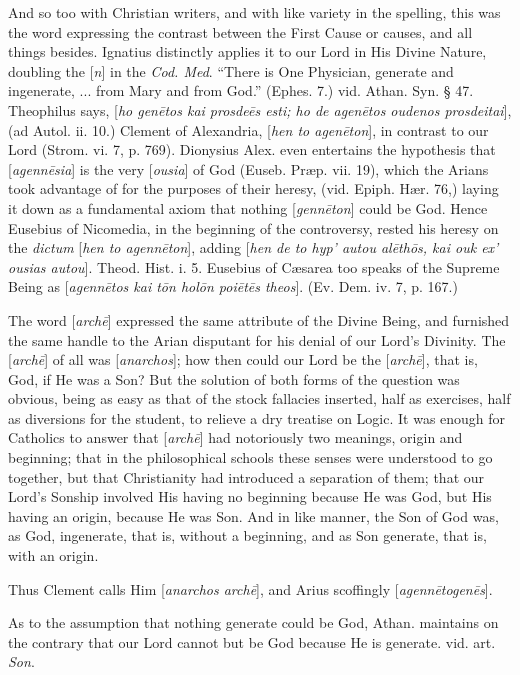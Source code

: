 And so too with Christian writers, and with like
variety in the spelling, this was the word expressing the contrast
between the First Cause or causes, and all things besides. Ignatius
distinctly applies it to our Lord in His Divine Nature, doubling the [\emph{n}]
in the \emph{Cod. Med}. ``There is One Physician, generate and
ingenerate, ... from Mary and from God.'' (Ephes. 7.) vid. Athan. Syn.
§ 47. Theophilus says, [\emph{ho gen\={e}tos kai prosde\={e}s esti;
ho de agen\={e}tos oudenos prosdeitai}], (ad Autol. ii. 10.)
Clement of Alexandria, [\emph{hen to agen\={e}ton}], in contrast to
our Lord (Strom. vi. 7, p. 769). Dionysius Alex. even entertains the
hypothesis that [\emph{agenn\={e}sia}] is the very [\emph{ousia}]
of God (Euseb. Præp. vii. 19), which the Arians took advantage of for
the purposes of their heresy, (vid. Epiph. Hær. 76,) laying it down
as a fundamental axiom that nothing [\emph{genn\={e}ton}] could be
God. Hence Eusebius of Nicomedia, in the beginning of the controversy,
rested his heresy on the \emph{dictum} [\emph{hen to agenn\={e}ton}],
adding [\emph{hen de to hyp'
autou al\={e}th\={o}s, kai ouk ex' ousias autou}].
Theod. Hist. i. 5. Eusebius of Cæsarea too speaks of the Supreme
Being as [\emph{agenn\={e}tos kai t\={o}n hol\={o}n poi\={e}t\={e}s
theos}]. (Ev. Dem. iv. 7, p. 167.)

The word [\emph{arch\={e}}] expressed the same
attribute of the Divine Being, and furnished the same handle to the
Arian disputant for his denial of our Lord's Divinity. The [\emph{arch\={e}}]
of all was [\emph{anarchos}]; how then could our Lord be the [\emph{arch\={e}}],
that is, God, if He was a Son? But the solution of both forms of the
question was obvious, being as easy as that of the stock
fallacies inserted, half as exercises, half as diversions for the
student, to relieve a dry treatise on Logic. It was enough for
Catholics to answer that [\emph{arch\={e}}] had notoriously two
meanings, origin and beginning; that in the philosophical schools
these senses were understood to go together, but that Christianity had
introduced a separation of them; that our Lord's Sonship involved His
having no beginning because He was God, but His having an origin,
because He was Son. And in like manner, the Son of God was, as God,
ingenerate, that is, without a beginning, and as Son generate, that
is, with an origin.

Thus Clement calls Him [\emph{anarchos arch\={e}}],
and Arius scoffingly [\emph{agenn\={e}togen\={e}s}].

As to the assumption that nothing generate could
be God, Athan. maintains on the contrary that our Lord cannot but be
God because He is generate. vid. art. \emph{Son}.

